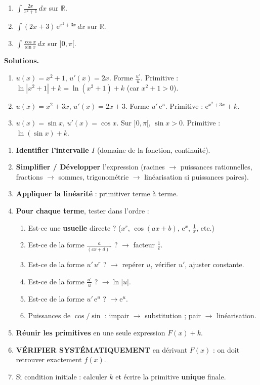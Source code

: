 \documentclass[11pt]{article}
\begin{document}
\begin{exoresolu}
\begin{enumerate}
  \item $\displaystyle \int \frac{2x}{x^2+1}\,dx$ sur $\mathbb{R}$.
  \item $\displaystyle \int (2x+3)\,\mathrm{e}^{x^2+3x}\,dx$ sur $\mathbb{R}$.
  \item $\displaystyle \int \frac{\cos x}{\sin x}\,dx$ sur $]0,\pi[$.
\end{enumerate}
\tcblower
\textbf{Solutions.}
\begin{enumerate}
  \item $u(x)=x^2+1$, $u'(x)=2x$. Forme $\frac{u'}{u}$.
  Primitive : $\ln|x^2+1| + k = \ln(x^2+1) + k$ (car $x^2+1>0$).
  \item $u(x)=x^2+3x$, $u'(x)=2x+3$. Forme $u'\,\mathrm{e}^u$.
  Primitive : $\mathrm{e}^{x^2+3x} + k$.
  \item $u(x)=\sin x$, $u'(x)=\cos x$. Sur $]0,\pi[$, $\sin x > 0$.
  Primitive : $\ln(\sin x) + k$.
\end{enumerate}
\end{exoresolu}

\begin{methode}
\begin{enumerate}
  \item \textbf{Identifier l'intervalle $I$} (domaine de la fonction, continuité).
  \item \textbf{Simplifier / Développer} l'expression (racines $\to$ puissances rationnelles, fractions $\to$ sommes, trigonométrie $\to$ linéarisation si puissances paires).
  \item \textbf{Appliquer la linéarité} : primitiver terme à terme.
  \item \textbf{Pour chaque terme}, tester dans l'ordre :
  \begin{enumerate}
    \item Est-ce une \textbf{usuelle} directe ? ($x^r$, $\cos(ax+b)$, $\mathrm{e}^x$, $\frac{1}{x}$, etc.)
    \item Est-ce de la forme $\frac{a}{(cx+d)^r}$ ? $\to$ facteur $\frac{1}{c}$.
    \item Est-ce de la forme $u'\,u^r$ ? $\to$ repérer $u$, vérifier $u'$, ajuster constante.
    \item Est-ce de la forme $\frac{u'}{u}$ ? $\to \ln|u|$.
    \item Est-ce de la forme $u'\,\mathrm{e}^u$ ? $\to \mathrm{e}^u$.
    \item Puissances de $\cos/\sin$ : impair $\to$ substitution ; pair $\to$ linéarisation.
  \end{enumerate}
  \item \textbf{Réunir les primitives} en une seule expression $F(x) + k$.
  \item \textbf{VÉRIFIER SYSTÉMATIQUEMENT} en dérivant $F(x)$ : on doit retrouver exactement $f(x)$.
  \item Si condition initiale : calculer $k$ et écrire la primitive \textbf{unique} finale.
\end{enumerate}
\end{methode}
\end{document}
